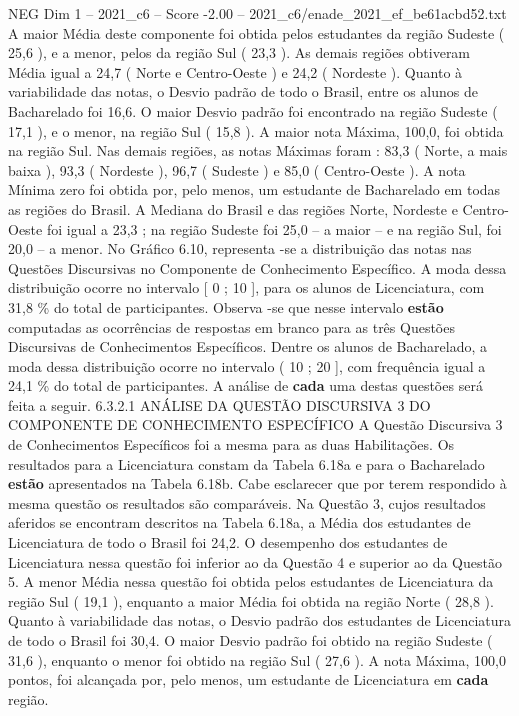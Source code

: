 \begin{textsample}{NEG Dim 1 – 2021\_c6 – Score -2.00 – 2021\_c6/enade\_2021\_ef\_be61acbd52.txt}
A maior Média deste componente foi obtida pelos estudantes da região Sudeste ( 25,6 ), e a menor, pelos da região Sul ( 23,3 ).
As demais regiões obtiveram Média igual a 24,7 ( Norte e Centro-Oeste ) e 24,2 ( Nordeste ).
Quanto à variabilidade das notas, o Desvio padrão de todo o Brasil, entre os alunos de Bacharelado foi 16,6.
O maior Desvio padrão foi encontrado na região Sudeste ( 17,1 ), e o menor, na região Sul ( 15,8 ).
A maior nota Máxima, 100,0, foi obtida na região Sul.
Nas demais regiões, as notas Máximas foram : 83,3 ( Norte, a mais baixa ), 93,3 ( Nordeste ), 96,7 ( Sudeste ) e 85,0 ( Centro-Oeste ).
A nota Mínima zero foi obtida por, pelo menos, um estudante de Bacharelado em todas as regiões do Brasil.
A Mediana do Brasil e das regiões Norte, Nordeste e Centro-Oeste foi igual a 23,3 ; na região Sudeste foi 25,0 – a maior – e na região Sul, foi 20,0 – a menor.
No Gráfico 6.10, representa -se a distribuição das notas nas Questões Discursivas no Componente de Conhecimento Específico.
A moda dessa distribuição ocorre no intervalo [ 0 ; 10 ], para os alunos de Licenciatura, com 31,8 \% do total de participantes.
Observa -se que nesse intervalo \textbf{estão} computadas as ocorrências de respostas em branco para as três Questões Discursivas de Conhecimentos Específicos.
Dentre os alunos de Bacharelado, a moda dessa distribuição ocorre no intervalo ( 10 ; 20 ], com frequência igual a 24,1 \% do total de participantes.
A análise de \textbf{cada} uma destas questões será feita a seguir. 6.3.2.1 ANÁLISE DA QUESTÃO DISCURSIVA 3 DO COMPONENTE DE CONHECIMENTO ESPECÍFICO A Questão Discursiva 3 de Conhecimentos Específicos foi a mesma para as duas Habilitações.
Os resultados para a Licenciatura constam da Tabela 6.18a e para o Bacharelado \textbf{estão} apresentados na Tabela 6.18b.
Cabe esclarecer que por terem respondido à mesma questão os resultados são comparáveis.
Na Questão 3, cujos resultados aferidos se encontram descritos na Tabela 6.18a, a Média dos estudantes de Licenciatura de todo o Brasil foi 24,2.
O desempenho dos estudantes de Licenciatura nessa questão foi inferior ao da Questão 4 e superior ao da Questão 5.
A menor Média nessa questão foi obtida pelos estudantes de Licenciatura da região Sul ( 19,1 ), enquanto a maior Média foi obtida na região Norte ( 28,8 ).
Quanto à variabilidade das notas, o Desvio padrão dos estudantes de Licenciatura de todo o Brasil foi 30,4.
O maior Desvio padrão foi obtido na região Sudeste ( 31,6 ), enquanto o menor foi obtido na região Sul ( 27,6 ).
A nota Máxima, 100,0 pontos, foi alcançada por, pelo menos, um estudante de Licenciatura em \textbf{cada} região.

\end{textsample}
